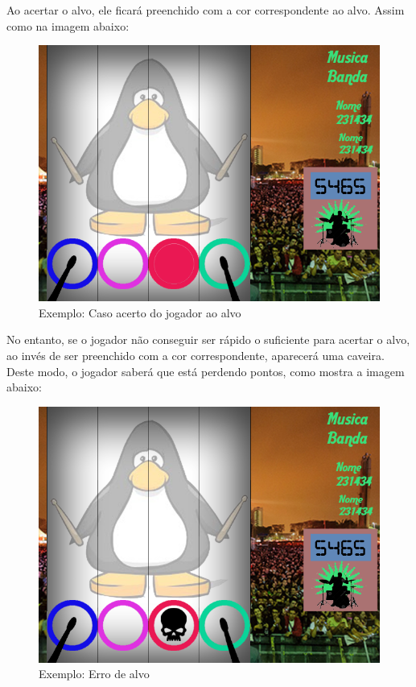 \documentclass{sciposter}
\begin{document}
\begin{multicols}{3}
Ao acertar o alvo, ele ficará preenchido com a cor correspondente ao alvo. Assim como na imagem abaixo: 

\begin{figure}[!htb]
\centering
\includegraphics[scale=2.3]{AccertCase.png}
\caption{Exemplo: Caso acerto do jogador ao alvo}
\end{figure}

No entanto, se o jogador não conseguir ser rápido o suficiente para acertar o alvo, ao invés de ser preenchido com a cor correspondente, aparecerá uma caveira. Deste modo, o jogador saberá que está perdendo pontos, como mostra a imagem abaixo:

\begin{figure}[!htb]
\centering
\includegraphics[scale=2.3]{ErrorCase.png}
\caption{Exemplo: Erro de alvo}
\end{figure}


\end{multicols}
\end{document}
